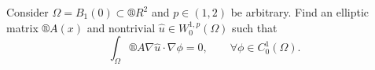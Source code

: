 \documentclass[12pt]{article}					%
\begin{document}
\begin{priklad}[1.]
	Consider $\Omega = B_1(0) \subset ®R^2$ and $p \in (1, 2)$ be arbitrary. Find an elliptic matrix $®A(x)$ and nontrivial $\hat{u} \in W_0^{1, p}(\Omega)$ such that
	$$ \int_\Omega ®A \nabla \hat{u} · \nabla \phi = 0, \qquad \forall \phi \in C_0^1(\Omega). $$
\end{priklad}
\end{document}
